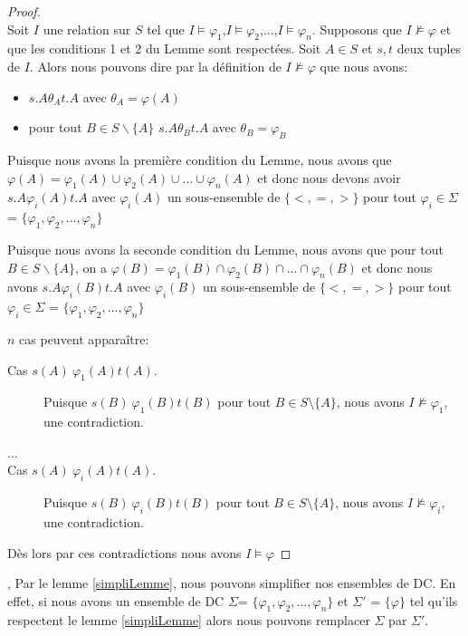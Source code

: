 \documentclass[letterpaper, 12pt]{report}
\theoremstyle{definition}
\begin{document}
\begin{proof}~\\
Soit $I$ une relation sur $S$ tel que $I \models \varphi_1$,$I \models \varphi_2$,...,$I \models \varphi_n$. Supposons que $I \not\models \varphi$ et que les conditions 1 et 2 du Lemme sont respectées. Soit $A \in S$ et $s,t$ deux tuples de $I$. Alors nous pouvons dire par la définition de $I \not\models \varphi$ que nous avons:

\begin{itemize} 
\item $s.A \theta_A t.A$ avec $\theta_A = \varphi(A)$
\item pour tout $B \in S \backslash \{A\}$ $s.A \theta_B t.A$ avec $\theta_B = \varphi_B$
\end{itemize}

Puisque nous avons la première condition du Lemme, nous avons que $\varphi(A) = \varphi_1(A) \cup \varphi_2(A) \cup ... \cup \varphi_n(A)$ et donc nous devons avoir $s.A \varphi_i(A) t.A$ avec $\varphi_i(A)$ un sous-ensemble de $\{<,=,>\}$ pour tout $\varphi_i \in \Sigma$ = $\{\varphi_1 , \varphi_2,..., \varphi_n \}$

Puisque nous avons la seconde condition du Lemme, nous avons que pour tout $B \in S \backslash \{A\}$, on a  $\varphi(B) = \varphi_1(B) \cap \varphi_2(B) \cap  ... \cap \varphi_n(B)$ et donc nous avons $s.A \varphi_i(B) t.A$ avec $\varphi_i(B)$ un sous-ensemble de $\{<,=,>\}$ pour tout $\varphi_i \in \Sigma$ = $\{\varphi_1 , \varphi_2,..., \varphi_n \}$

$n$ cas peuvent apparaître:
\begin{description}
\item[Cas $s(A)\ \varphi_{1}(A) t(A)$.]
Puisque $s(B)\ \varphi_{1}(B) t(B)$ pour tout $B\in S\setminus\{A\}$,
nous avons $I\not\models\varphi_{1}$, une contradiction.
\item[...]
\item[Cas $s(A)\ \varphi_{i}(A) t(A)$.]
Puisque $s(B)\ \varphi_{i}(B) t(B)$ pour tout $B\in S\setminus\{A\}$,
nous avons $I\not\models\varphi_{i}$, une contradiction.
\end{description}

Dès lors par ces contradictions nous avons $I \models \varphi$
\end{proof}
,
Par le lemme \ref{simpliLemme}, nous pouvons simplifier nos ensembles de DC. En effet, si nous avons un ensemble de DC $\Sigma$= $\{\varphi_1 , \varphi_2,..., \varphi_n \}$ et $\Sigma'$ = $\{ \varphi \}$ tel qu'ils respectent le lemme \ref{simpliLemme} alors nous pouvons remplacer $\Sigma$ par $\Sigma'$.\\
\end{document}
